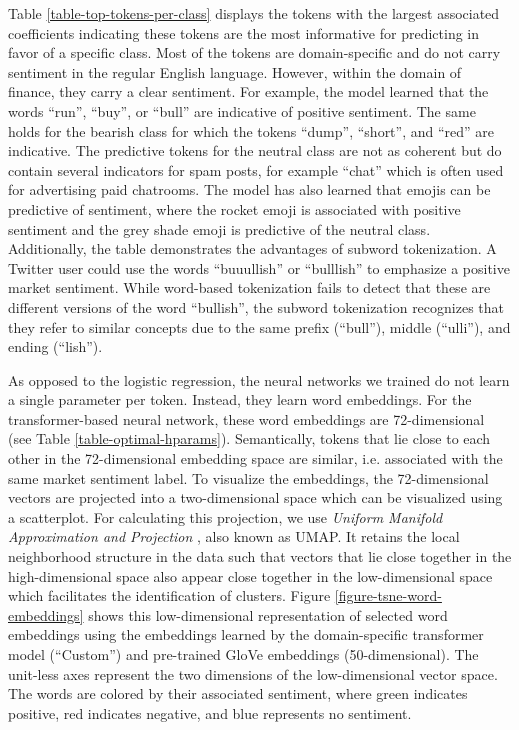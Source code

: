 Table \ref{table-top-tokens-per-class} displays the tokens with the largest associated coefficients indicating these tokens are the most informative for predicting in favor of a specific class. Most of the tokens are domain-specific and do not carry sentiment in the regular English language. However, within the domain of finance, they carry a clear sentiment. For example, the model learned that the words ``run'', ``buy'', or ``bull'' are indicative of positive sentiment. The same holds for the bearish class for which the tokens ``dump'', ``short'', and ``red'' are indicative. The predictive tokens for the neutral class are not as coherent but do contain several indicators for spam posts, for example ``chat'' which is often used for advertising paid chatrooms. The model has also learned that emojis can be predictive of sentiment, where the rocket emoji is associated with positive sentiment and the grey shade emoji is predictive of the neutral class. Additionally, the table demonstrates the advantages of subword tokenization. A Twitter user could use the words ``buuullish'' or ``bulllish'' to emphasize a positive market sentiment. While word-based tokenization fails to detect that these are different versions of the word ``bullish'', the subword tokenization recognizes that they refer to similar concepts due to the same prefix (``bull''), middle (``ulli''), and ending (``lish'').



As opposed to the logistic regression, the neural networks we trained do not learn a single parameter per token. Instead, they learn word embeddings. For the transformer-based neural network, these word embeddings are 72-dimensional (see Table \ref{table-optimal-hparams}). Semantically, tokens that lie close to each other in the 72-dimensional embedding space are similar, i.e. associated with the same market sentiment label. To visualize the embeddings, the 72-dimensional vectors are projected into a two-dimensional space which can be visualized using a scatterplot. For calculating this projection, we use \emph{Uniform Manifold Approximation and Projection} , also known as UMAP. It retains the local neighborhood structure in the data such that vectors that lie close together in the high-dimensional space also appear close together in the low-dimensional space which facilitates the identification of clusters. Figure \ref{figure-tsne-word-embeddings} shows this low-dimensional representation of selected word embeddings using the embeddings learned by the domain-specific transformer model (``Custom'') and pre-trained GloVe embeddings (50-dimensional). The unit-less axes represent the two dimensions of the low-dimensional vector space. The words are colored by their associated sentiment, where green indicates positive, red indicates negative, and blue represents no sentiment.

